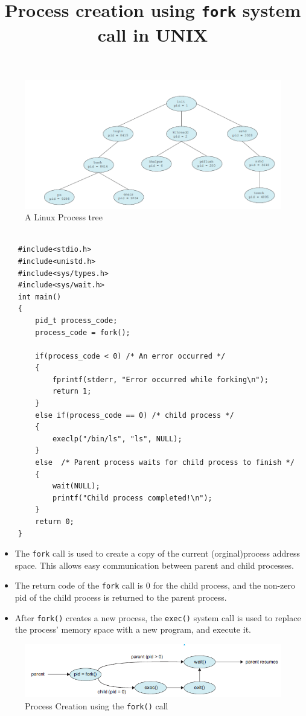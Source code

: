 \documentclass{article}
\theoremstyle{plain}
\theoremstyle{definition}
\begin{document}
\begin{figure}[h]
    \centering
    \includegraphics[scale=0.8]{os18.png}
    \caption{A Linux Process tree}
    \label{fig:my_label_z}
\end{figure}
\break
\begin{listing}[ht]
\centering
    \begin{verbatim}
    
    #include<stdio.h>
    #include<unistd.h>
    #include<sys/types.h>
    #include<sys/wait.h>
    int main()
    {
        pid_t process_code;
        process_code = fork();
        
        if(process_code < 0) /* An error occurred */
        {
            fprintf(stderr, "Error occurred while forking\n");
            return 1;
        }
        else if(process_code == 0) /* child process */
        {
            execlp("/bin/ls", "ls", NULL);
        }
        else  /* Parent process waits for child process to finish */
        {
            wait(NULL);
            printf("Child process completed!\n");
        }
        return 0;
    }
    \end{verbatim}
    \title{Process creation using \texttt{fork} system call in UNIX}
\end{listing}
\begin{itemize}
    \item The \texttt{fork} call is used to create a copy of the current (orginal)process address space. This allows easy communication between parent and child processes.
    
    \item The return code of the \texttt{fork} call is 0 for the child process, and the non-zero pid of the child process is returned to the parent process. 
    
    \item After \texttt{fork()} creates a new process, the \texttt{exec()} system call is used to replace the process' memory space with a new program, and execute it. 
\end{itemize}
\begin{figure}[h]
    \centering
    \includegraphics{os19.png}
    \caption{Process Creation using the \texttt{fork()} call}
    \label{fig:my_label_zzz}
\end{figure}
\end{document}
